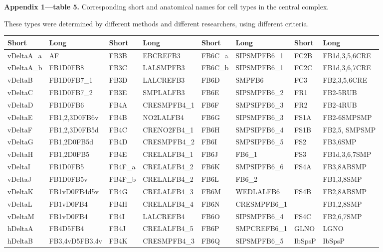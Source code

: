 \documentclass{article}
\begin{document}
\noindent\textbf{Appendix 1—table 5.} Corresponding short and anatomical names for cell types in the central complex.

\noindent These types were determined by different methods and different researchers, using different criteria.

\begin{center}\scriptsize
\begin{longtable}{llllllll}
\textbf{Short} & \textbf{Long} & \textbf{Short} & \textbf{Long} & \textbf{Short} & \textbf{Long} & \textbf{Short} & \textbf{Long} \\
\hline
vDeltaA\_a & AF & FB3B & EBCREFB3 & FB6C\_a & SIPSMPFB6\_1 & FC2B & FB1d,3,5,6CRE \\
vDeltaA\_b & FB1D0FB8 & FB3C & LALSMPFB3 & FB6C\_b & SIPSMPFB6\_1 & FC2C & FB1d,3,6,7CRE \\
vDeltaB & FB1D0FB7\_1 & FB3D & LALCREFB3 & FB6D & SMPFB6 & FC3 & FB2,3,5,6CRE \\
vDeltaC & FB1D0FB7\_2 & FB3E & SMPLALFB3 & FB6E & SIPSMPFB6\_2 & FR1 & FB2-5RUB \\
vDeltaD & FB1D0FB6 & FB4A & CRESMPFB4\_1 & FB6F & SMPSIPFB6\_3 & FR2 & FB2-4RUB \\
vDeltaE & FB1,2,3D0FB6v & FB4B & NO2LALFB4 & FB6G & SIPSMPFB6\_3 & FS1A & FB2-6SMPSMP \\
vDeltaF & FB1,2,3D0FB5d & FB4C & CRENO2FB4\_1 & FB6H & SMPSIPFB6\_4 & FS1B & FB2,5, SMPSMP \\
vDeltaG & FB1,2D0FB5d & FB4D & CRESMPFB4\_2 & FB6I & SMPSIPFB6\_5 & FS2 & FB3,6SMP \\
vDeltaH & FB1,2D0FB5 & FB4E & CRELALFB4\_1 & FB6J & FB6\_1 & FS3 & FB1d,3,6,7SMP \\
vDeltaI & FB1D0FB5 & FB4F\_a & CRELALFB4\_2 & FB6K & SMPSIPFB6\_6 & FS4A & FB3,8ABSMP \\
vDeltaJ & FB1D0FB5v & FB4F\_b & CRELALFB4\_2 & FB6L & FB6\_2 &  & FB1,3,8SMP \\
vDeltaK & FB1vD0FB4d5v & FB4G & CRELALFB4\_3 & FB6M & WEDLALFB6 & FS4B & FB2,8ABSMP \\
vDeltaL & FB1vD0FB4 & FB4H & CRELALFB4\_4 & FB6N & CRESMPFB6\_1 &  & FB1,2,8SMP \\
vDeltaM & FB1vD0FB4 & FB4I & LALCREFB4 & FB6O & SIPSMPFB6\_4 & FS4C & FB2,6,7SMP \\
hDeltaA & FB4D5FB4 & FB4J & CRELALFB4\_5 & FB6P & SMPCREFB6\_1 & GLNO & LGNO \\
hDeltaB & FB3,4vD5FB3,4v & FB4K & CRESMPFB4\_3 & FB6Q & SIPSMPFB6\_5 & IbSpsP & IbSpsP \\

\end{longtable}
\end{center}
\end{document}
